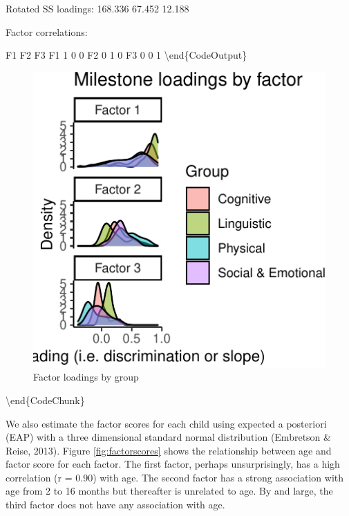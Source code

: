 \documentclass[10pt, letterpaper]{article}
\begin{document}
Rotated SS loadings: 168.336 67.452 12.188

Factor correlations:

F1 F2 F3 F1 1 0 0 F2 0 1 0 F3 0 0 1 \textbackslash end\{CodeOutput\}

\begin{figure}[tb]
\includegraphics{figs/factorloadings-1} \caption[Factor loadings by group]{Factor loadings by group}\label{fig:factorloadings}
\end{figure}

\textbackslash end\{CodeChunk\}

We also estimate the factor scores for each child using expected a
posteriori (EAP) with a three dimensional standard normal distribution
(Embretson \& Reise, 2013). Figure \ref{fig:factorscores} shows the
relationship between age and factor score for each factor. The first
factor, perhaps unsurprisingly, has a high correlation (r = 0.90) with
age. The second factor has a strong association with age from 2 to 16
months but thereafter is unrelated to age. By and large, the third
factor does not have any association with age.
\end{document}
